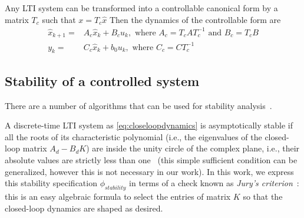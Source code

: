 \documentclass[sigconf]{llncs}
\newcommand{\mat}[1]{{#1}}
\renewcommand{\vec}[1]{{#1}}
\begin{document}
Any LTI system can be transformed into a controllable canonical form by a
matrix $\mat{T}_c$ such that $\vec{x}=\mat{T}_c\hat{\vec{x}}$ Then the
dynamics of the controllable form are
%
\begin{align*}
\hat{\vec{x}}_{k+1}=&\mat{A}_c\hat{\vec{x}}_k+\mat{B}_cu_k, \text{ where } \mat{A}_c=\mat{T}_c\mat{A}\mat{T}_c^{-1} \text{ and } \mat{B}_c=\mat{T}_c\mat{B}\\
y_k=&\mat{C}_c\hat{\vec{x}}_k + b_0u_k, \text{ where } \mat{C}_c=\mat{C}\mat{T}_c^{-1}\nonumber
\end{align*}
%

\subsection{Stability of a controlled system} 
\label{sec:closed_stability}
There are a number of algorithms that can be
used for stability analysis~\cite{daes20161,Bessa16}.

A discrete-time LTI system as \eqref{eq:closeloopdynamics} is asymptotically
stable if all the roots of its characteristic polynomial (i.e., the
eigenvalues of the closed-loop matrix $A_d - B_d K$) are inside the unity
circle of the complex plane, i.e., their absolute values are strictly less
than one~\cite{astrom1997computer} (this simple sufficient condition can be
generalized, however this is not necessary in our work).  In this work, we
express this stability specification $\phi_\mathit{stability}$ in terms of a
check known as \emph{Jury's criterion}~\cite{fadali}: this is an easy
algebraic formula to select the entries of matrix $K$ so that the
closed-loop dynamics are shaped as desired.
\end{document}
